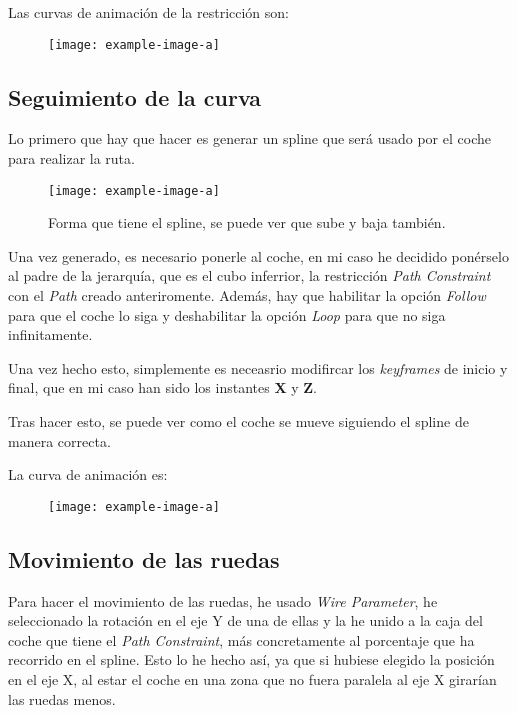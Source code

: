 Las curvas de animación de la restricción son:

\begin{figure}[H]
    \centering
   \texttt{[image: example-image-a]}
\end{figure}

\blindtext

\subsection{Seguimiento de la curva}

Lo primero que hay que hacer es generar un spline que será usado por el coche para realizar la ruta.

\begin{figure}[H]
    \centering
   \texttt{[image: example-image-a]}
   \caption{Forma que tiene el spline, se puede ver que sube y baja también.}
\end{figure}

Una vez generado, es necesario ponerle al coche, en mi caso he decidido ponérselo al padre de la jerarquía, que es el cubo inferrior, la restricción \textit{Path Constraint} con el \textit{Path} creado anteriromente. Además, hay que habilitar la opción \textit{Follow} para que el coche lo siga y deshabilitar la opción \textit{Loop} para que no siga infinitamente.

\bigskip

Una vez hecho esto, simplemente es neceasrio modifircar los \textit{keyframes} de inicio y final, que en mi caso han sido los instantes \textbf{X} y \textbf{Z}.

\bigskip

Tras hacer esto, se puede ver como el coche se mueve siguiendo el spline de manera correcta.

\bigskip

La curva de animación es:

\begin{figure}[H]
    \centering
   \texttt{[image: example-image-a]}
\end{figure}

\blindtext

\subsection{Movimiento de las ruedas}

Para hacer el movimiento de las ruedas, he usado \textit{Wire Parameter}, he seleccionado la rotación en el eje Y de una de ellas y la he unido a la caja del coche que tiene el \textit{Path Constraint}, más concretamente al porcentaje que ha recorrido en el spline. Esto lo he hecho así, ya que si hubiese elegido la posición en el eje X, al estar el coche en una zona que no fuera paralela al eje X girarían las ruedas menos.

